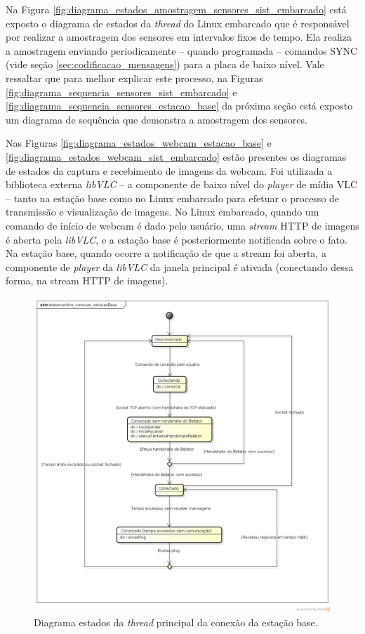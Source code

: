 Na Figura \ref{fig:diagrama_estados_amostragem_sensores_sist_embarcado} está exposto o diagrama de estados da \textit{thread} do Linux embarcado que é responsável por realizar a amostragem dos sensores em intervalos fixos de tempo. Ela realiza a amostragem enviando periodicamente -- quando programada -- comandos SYNC (vide seção \ref{sec:codificacao_mensagens}) para a placa de baixo nível. Vale ressaltar que para melhor explicar este processo, na Figuras \ref{fig:diagrama_sequencia_sensores_sist_embarcado} e \ref{fig:diagrama_sequencia_sensores_estacao_base} da próxima seção está exposto um diagrama de sequência que demonstra a amostragem dos sensores.

Nas Figuras \ref{fig:diagrama_estados_webcam_estacao_base} e \ref{fig:diagrama_estados_webcam_sist_embarcado} estão presentes os diagramas de estados da captura e recebimento de imagens da webcam. Foi utilizada a biblioteca externa \textit{libVLC} \cite{vlc} -- a componente de baixo nível do \textit{player} de mídia VLC -- tanto na estação base como no Linux embarcado para efetuar o processo de transmissão e visualização de imagens. No Linux embarcado, quando um comando de início de webcam é dado pelo usuário, uma \textit{stream} HTTP de imagens é aberta pela \textit{libVLC}, e a estação base é posteriormente notificada sobre o fato. Na estação base, quando ocorre a notificação de que a stream foi aberta, a componente de \textit{player} da \textit{libVLC} da janela principal é ativada (conectando dessa forma, na stream HTTP de imagens).



\begin{figure}[H]
  \centering
  \includegraphics[width=\textwidth, keepaspectratio]{./figuras/estacaoBase/statemachine_conexao_estacaoBase.png}
  \caption{Diagrama estados da \textit{thread} principal da conexão da estação base.}
  \label{fig:diagrama_estados_estacao_base}
\end{figure}

